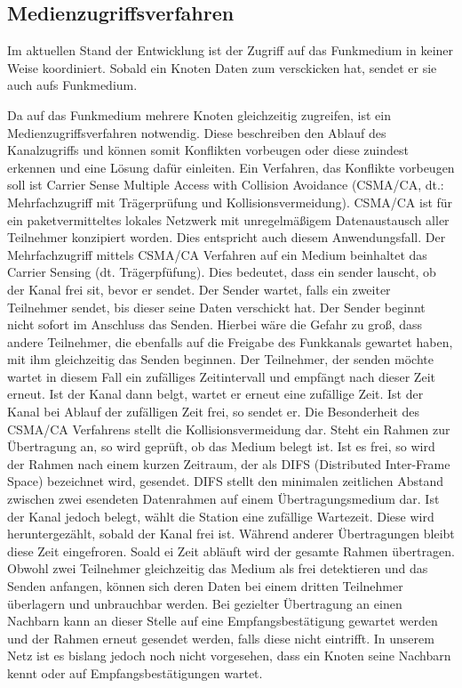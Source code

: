 \documentclass{IEEEtran}
\begin{document}
    \subsection{Medienzugriffsverfahren}
    Im aktuellen Stand der Entwicklung ist der Zugriff auf das Funkmedium in keiner Weise koordiniert. Sobald ein Knoten Daten zum versckicken hat, sendet er sie auch aufs Funkmedium. 

    Da auf das Funkmedium mehrere Knoten gleichzeitig zugreifen, ist ein Medienzugriffsverfahren notwendig. Diese beschreiben den Ablauf des Kanalzugriffs und können somit Konflikten vorbeugen oder diese zuindest erkennen und eine Lösung dafür einleiten. Ein Verfahren, das Konflikte vorbeugen soll ist Carrier Sense Multiple Access with Collision Avoidance (CSMA/CA, dt.: Mehrfachzugriff mit Trägerprüfung und Kollisionsvermeidung). CSMA/CA ist für ein paketvermitteltes lokales Netzwerk mit unregelmäßigem Datenaustausch aller Teilnehmer konzipiert worden. Dies entspricht auch diesem Anwendungsfall.
    Der Mehrfachzugriff mittels CSMA/CA Verfahren auf ein Medium beinhaltet das Carrier Sensing (dt. Trägerpfüfung). Dies bedeutet, dass ein sender lauscht, ob der Kanal frei sit, bevor er sendet. Der Sender wartet, falls ein zweiter Teilnehmer sendet, bis dieser seine Daten verschickt hat. Der Sender beginnt nicht sofort im Anschluss das Senden. Hierbei wäre die Gefahr zu groß, dass andere Teilnehmer, die ebenfalls auf die Freigabe des Funkkanals gewartet haben, mit ihm gleichzeitig das Senden beginnen. Der Teilnehmer, der senden möchte wartet in diesem Fall ein zufälliges Zeitintervall und empfängt nach dieser Zeit erneut. Ist der Kanal dann belgt, wartet er erneut eine zufällige Zeit. Ist der Kanal bei Ablauf der zufälligen Zeit frei, so sendet er.
    Die Besonderheit des CSMA/CA Verfahrens stellt die Kollisionsvermeidung dar. Steht ein Rahmen zur Übertragung an, so wird geprüft, ob das Medium belegt ist. Ist es frei, so wird der Rahmen nach einem kurzen Zeitraum, der als DIFS (Distributed Inter-Frame Space) bezeichnet wird, gesendet. DIFS stellt den minimalen zeitlichen Abstand zwischen zwei esendeten Datenrahmen auf einem Übertragungsmedium dar. Ist der Kanal jedoch belegt, wählt die Station eine zufällige Wartezeit. Diese wird heruntergezählt, sobald der Kanal frei ist. Während anderer Übertragungen bleibt diese Zeit eingefroren. Soald ei Zeit abläuft wird der gesamte Rahmen übertragen. 
    Obwohl zwei Teilnehmer gleichzeitig das Medium als frei detektieren und das Senden anfangen, können sich deren Daten bei einem dritten Teilnehmer überlagern und unbrauchbar werden. Bei gezielter Übertragung an einen Nachbarn kann an dieser Stelle auf eine Empfangsbestätigung gewartet werden und der Rahmen erneut gesendet werden, falls diese nicht eintrifft. In unserem Netz ist es bislang jedoch noch nicht vorgesehen, dass ein Knoten seine Nachbarn kennt oder auf Empfangsbestätigungen wartet. 
\end{document}
